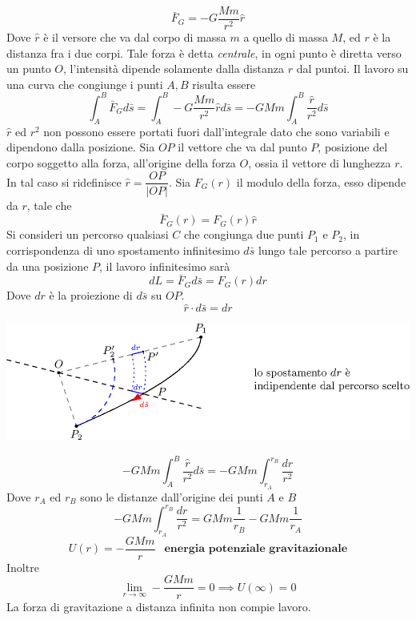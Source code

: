 \documentclass[10pt, letterpaper]{report}
\begin{document}
$$ \bar F_G=-G\frac{Mm}{r^2}\hat r$$
Dove $\hat r$ è il versore che va dal corpo di massa $m$ a quello di massa $M$, ed $r$ è la distanza fra i due corpi. Tale 
forza è detta \textit{centrale}, in ogni punto è diretta verso un punto $O$, l'intensità dipende 
solamente dalla distanza $r$ dal puntoi. Il lavoro su una curva 
che congiunge i punti $A,B$ risulta essere 
$$ \int_A^B\bar F_Gd\bar s=\int_A^B-G\frac{Mm}{r^2}\hat rd\bar s=
-GMm\int_A^B\frac{\hat r}{r^2} d\bar s$$
$\hat r$ ed $r^2$ non possono essere portati fuori dall'integrale dato che sono variabili e dipendono dalla 
posizione. Sia $OP$ il vettore che va dal punto $P$, posizione del corpo soggetto alla forza, all'origine della forza $O$, ossia 
il vettore di lunghezza $r$. In tal caso si ridefinisce $\hat r = \dfrac{OP}{|OP|}$. \acc 
Sia $F_G(r)$ il modulo della forza, esso dipende da $r$, tale che 
$$ \bar F_G(r)=F_G(r)\hat r$$
Si consideri un percorso qualsiasi $C$ che congiunga due punti $P_1$ e $P_2$, in corrispondenza di uno 
spostamento infinitesimo $d\bar s$ lungo tale percorso a partire da una posizione $P$, 
il lavoro infinitesimo sarà 
$$ dL=\bar F_Gd\bar s = F_G(r)dr$$
Dove $dr$ è la proiezione di $d\bar s$ su $OP$. 
$$ \hat r \cdot d\bar s=dr$$ 
\begin{center}
    \includegraphics[width=1\textwidth]{images/forzaCentrale.eps}
\end{center}
$$ 
-GMm\int_A^B\frac{\hat r}{r^2} d\bar s=
-GMm\int_{r_A}^{r_B}\frac{dr}{r^2}
$$
Dove $r_A$ ed $r_B$ sono le distanze dall'origine dei punti $A$ e $B$
$$-GMm\int_{r_A}^{r_B}\frac{dr}{r^2}=GMm\frac{1}{r_B}-GMm\frac{1}{r_A} $$
$$ U(r)=-\frac{GMm}{r} \ \  \textbf{ energia potenziale gravitazionale}$$
Inoltre 
$$ \lim_{r\rightarrow \infty}-\frac{GMm}{r}=0\implies U(\infty)=0$$
La forza di gravitazione a distanza infinita non compie lavoro.\begin{center}
\end{center}
\end{document}

